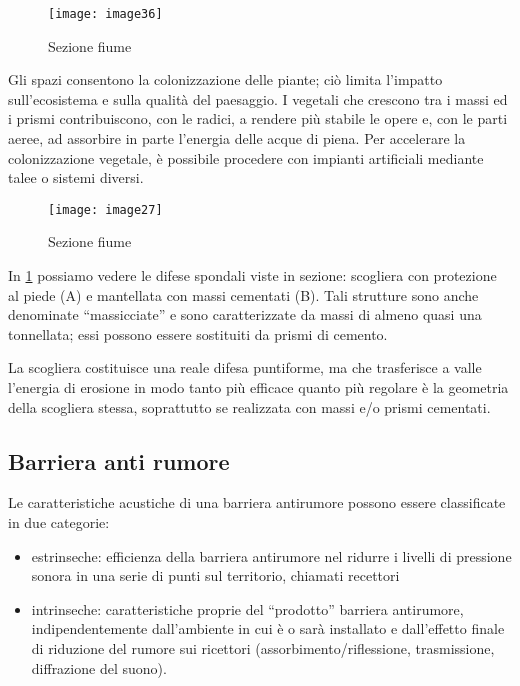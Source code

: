 \begin{figure}[H]
	\centering
	\texttt{[image: image36]}
	\caption{Sezione fiume}
	\label{fig:spnde}
\end{figure}

Gli spazi consentono la colonizzazione delle piante; ciò limita l’impatto sull'ecosistema e sulla qualità del paesaggio. I vegetali che crescono tra i massi ed i prismi contribuiscono, con le radici, a rendere più stabile le opere e, con le parti aeree, ad assorbire in parte l’energia delle acque di piena. Per accelerare la colonizzazione vegetale, è possibile procedere con impianti artificiali mediante talee o sistemi diversi. \\

\begin{wrapfigure}[14]{r}{0.4\textwidth}
	\centering
	\texttt{[image: image27]}
	\caption{Sezione fiume}
\end{wrapfigure}

In \cref{fig:spnde} possiamo vedere le difese spondali viste in sezione: scogliera con protezione al piede (A) e mantellata con massi cementati (B).
Tali strutture sono anche denominate “massicciate” e sono caratterizzate da massi di almeno quasi una tonnellata; essi possono essere sostituiti da prismi di cemento. 


La scogliera costituisce una reale difesa puntiforme, ma che trasferisce a valle l’energia di erosione in modo tanto più efficace quanto più regolare è la geometria della scogliera stessa, soprattutto se realizzata con massi e/o prismi cementati.

\subsection{Barriera anti rumore}

Le caratteristiche acustiche di una barriera antirumore possono essere classificate in due categorie: 
\begin{itemize}
	\item estrinseche: efficienza della barriera antirumore nel ridurre i livelli di pressione sonora in una serie di punti sul territorio, chiamati recettori
	\item intrinseche: caratteristiche proprie del “prodotto” barriera antirumore, indipendentemente dall'ambiente in cui è o sarà installato e dall'effetto finale di riduzione del rumore sui ricettori (assorbimento/riflessione, trasmissione, diffrazione del suono).
\end{itemize}



